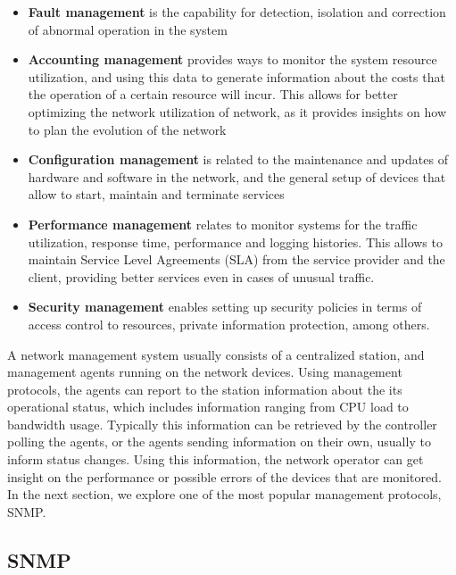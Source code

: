 \begin {itemize}
    \item \textbf {Fault management} is the capability for detection, isolation and correction of abnormal operation in the system
    \item \textbf {Accounting management} provides ways to monitor the system resource utilization, and using this data to generate information about the costs that the operation of a certain resource will incur. This 
        allows for better optimizing the network utilization of network, as it provides insights on how to plan the evolution of the network
    \item \textbf {Configuration management} is related to the maintenance and updates of hardware and software in the network, and the general setup of devices that allow to start, maintain and terminate services 
    \item \textbf {Performance management} relates to monitor systems for the traffic utilization, response time, performance and logging histories. This allows to maintain Service Level Agreements (SLA) from the service
        provider and the client, providing better services even in cases of unusual traffic.
    \item \textbf {Security management} enables setting up security policies in terms of access control to resources, private information protection, among others.
\end {itemize}

\par A network management system usually consists of a centralized station, and management agents running on the network devices. Using management protocols, the
agents can report to the station information about the its operational status, which includes information ranging from CPU load to bandwidth usage. Typically this
information can be retrieved by the controller polling the agents, or the agents sending information on their own, usually to inform status changes. Using this 
information, the network operator can get insight on the performance or possible errors of the devices that are monitored. In the next section, we explore one of the
most popular management protocols, SNMP.

\subsection {SNMP}

